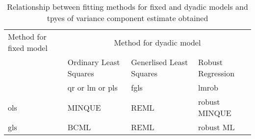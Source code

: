 %

\begin{table}
\centering
\caption{Relationship between fitting methods for fixed and dyadic models and tpyes of variance component estimate obtained}
\label{tab:compest}
\vspace{0.1in}
\begin{tabular}{|p{1.0in}|p{1.0in}|p{1.0in}|p{1.0in}|} \hline
Method for fixed model  & \multicolumn{3}{c|}{Method for dyadic model} \\ \cline{2-4}
                        & Ordinary Least Squares & Generlised Least Squares & Robust Regression \\ 
                        & qr or lm or pls & fgls & lmrob \\ \hline

 ols & MINQUE & REML & robust MINQUE  \\
 gls & BCML   & REML & robust ML \\ \hline

 
\end{tabular}
\end{table}

%
